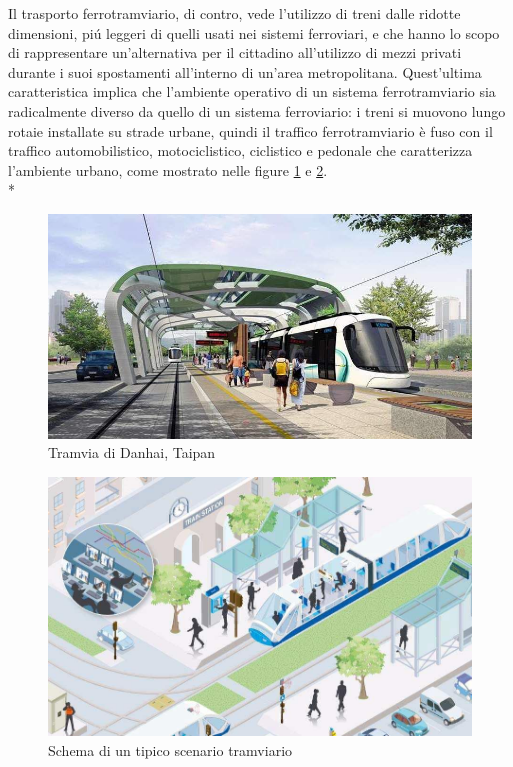 Il trasporto ferrotramviario, di contro, vede l'utilizzo di treni dalle ridotte dimensioni, pi\'u leggeri di quelli usati nei sistemi ferroviari, e che hanno lo scopo di rappresentare un'alternativa per il cittadino all'utilizzo di mezzi privati durante i suoi spostamenti all'interno di un'area metropolitana. Quest'ultima caratteristica implica che l'ambiente operativo di un sistema ferrotramviario sia radicalmente diverso da quello di un sistema ferroviario: i treni si muovono lungo rotaie installate su strade urbane, quindi il traffico ferrotramviario \`e fuso con il traffico automobilistico, motociclistico, ciclistico e pedonale che caratterizza l'ambiente urbano, come mostrato nelle figure \ref{fig:danhai} e \ref{fig:tramschema}.\\*
\begin{figure}[h]
	\centering
	\includegraphics[width=0.7\linewidth]{img/danhai}
	\caption{Tramvia di Danhai, Taipan}
	\label{fig:danhai}
\end{figure}
\begin{figure}[h]
	\centering
	\includegraphics[width=0.7\linewidth]{img/twschema}
	\caption{Schema di un tipico scenario tramviario}
	\label{fig:tramschema}
\end{figure}
